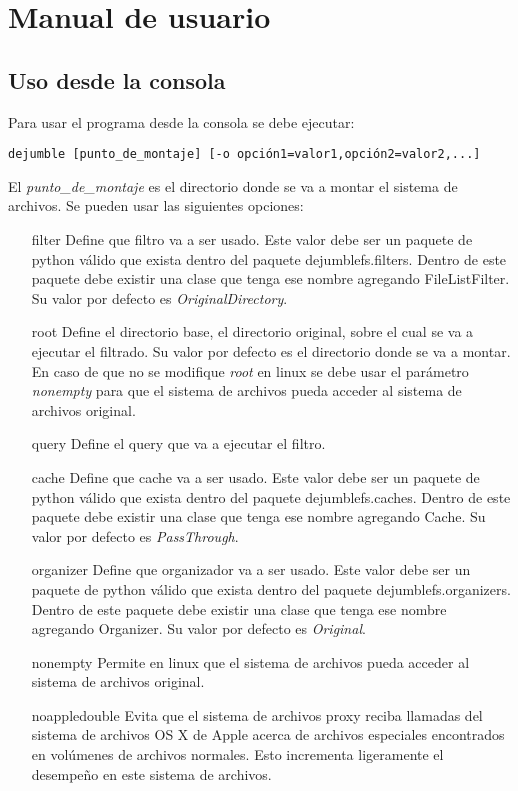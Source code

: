 \chapter{Manual de usuario}
\ifpdf
    \graphicspath{{Appendix2/Appendix2Figs/PNG/}{Appendix2/Appendix2Figs/PDF/}{Appendix2/Appendix2Figs/}}
\else
    \graphicspath{{Appendix2/Appendix2Figs/EPS/}{Appendix2/Appendix2Figs/}}
\fi

\section{Uso desde la consola}

Para usar el programa desde la consola se debe ejecutar:

\begin{verbatim}
dejumble [punto_de_montaje] [-o opción1=valor1,opción2=valor2,...]
\end{verbatim}

El \textit{punto\_de\_montaje} es el directorio donde se va a montar el sistema de archivos. Se pueden usar las siguientes opciones:

\begin{itemize}
\item[filter] Define que filtro va a ser usado. Este valor debe ser un paquete de python válido que exista dentro del paquete dejumblefs.filters. Dentro de este paquete debe existir una clase que tenga ese nombre agregando FileListFilter. Su valor por defecto es \textit{OriginalDirectory}.
\item[root] Define el directorio base, el directorio original, sobre el cual se va a ejecutar el filtrado. Su valor por defecto es el directorio donde se va a montar. En caso de que no se modifique \textit{root} en linux se debe usar el parámetro \textit{nonempty} para que el sistema de archivos pueda acceder al sistema de archivos original.
\item[query] Define el query que va a ejecutar el filtro.
\item[cache] Define que cache va a ser usado. Este valor debe ser un paquete de python válido que exista dentro del paquete dejumblefs.caches. Dentro de este paquete debe existir una clase que tenga ese nombre agregando Cache. Su valor por defecto es \textit{PassThrough}.
\item[organizer] Define que organizador va a ser usado. Este valor debe ser un paquete de python válido que exista dentro del paquete dejumblefs.organizers. Dentro de este paquete debe existir una clase que tenga ese nombre agregando Organizer. Su valor por defecto es \textit{Original}.
\item[nonempty] Permite en linux que el sistema de archivos pueda acceder al sistema de archivos original.
\item[noappledouble] Evita que el sistema de archivos proxy reciba llamadas del sistema de archivos OS X de Apple acerca de archivos especiales encontrados en volúmenes de archivos normales. Esto incrementa ligeramente el desempeño en este sistema de archivos.
\end{itemize}

